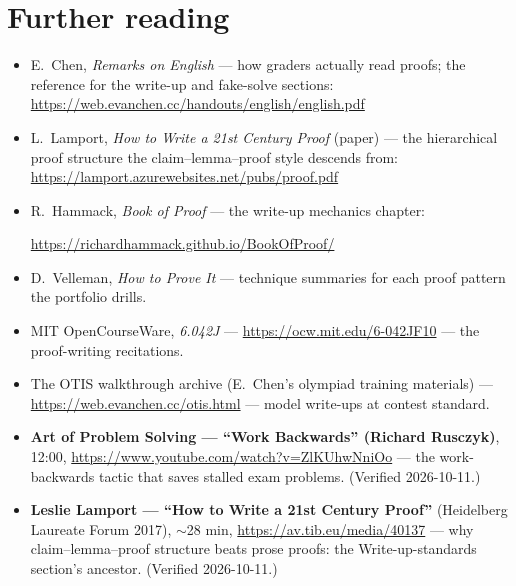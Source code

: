\section*{Further reading}
\begin{itemize}
\item E.~Chen, \emph{Remarks on English} --- how graders actually
read proofs; the reference for the write-up and fake-solve sections:
\url{https://web.evanchen.cc/handouts/english/english.pdf}
\item L.~Lamport, \emph{How to Write a 21st Century Proof} (paper)
--- the hierarchical proof structure the claim--lemma--proof style
descends from:
\url{https://lamport.azurewebsites.net/pubs/proof.pdf}
\item R.~Hammack, \emph{Book of Proof} --- the write-up
mechanics chapter:

\url{https://richardhammack.github.io/BookOfProof/}
\item D.~Velleman, \emph{How to Prove It} --- technique summaries for
each proof pattern the portfolio drills.
\item MIT OpenCourseWare, \emph{6.042J} ---
\url{https://ocw.mit.edu/6-042JF10}
--- the proof-writing recitations.
\item The OTIS walkthrough archive (E.~Chen's olympiad training
materials) ---
\url{https://web.evanchen.cc/otis.html}
--- model write-ups at contest
standard.
\end{itemize}

\begin{rulebox}
\begin{itemize}
\item \textbf{Art of Problem Solving --- ``Work Backwards'' (Richard
Rusczyk)}, 12:00,
\url{https://www.youtube.com/watch?v=ZlKUhwNniOo}
--- the work-backwards
tactic that saves stalled exam problems. (Verified 2026-10-11.)
\item \textbf{Leslie Lamport --- ``How to Write a 21st Century
Proof''} (Heidelberg Laureate Forum 2017), $\sim$28 min,
\url{https://av.tib.eu/media/40137}
--- why claim--lemma--proof
structure beats prose proofs: the Write-up-standards section's
ancestor. (Verified 2026-10-11.)
\end{itemize}
\end{rulebox}

\chapternotes
